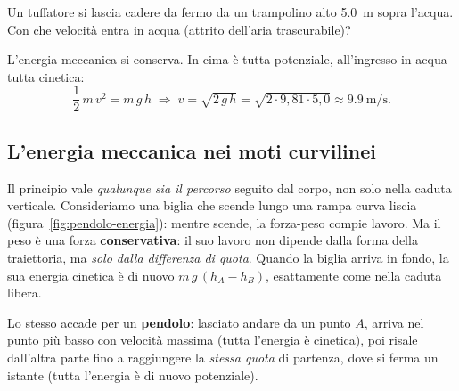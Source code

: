 \begin{testexample}
Un tuffatore si lascia cadere da fermo da un trampolino alto \SI{5,0}{\metre} sopra l'acqua. Con che velocità entra in acqua (attrito dell'aria trascurabile)?

L'energia meccanica si conserva. In cima è tutta potenziale, all'ingresso in acqua tutta cinetica:
\[ \frac12\,m\,v^2 = m\,g\,h \;\Longrightarrow\; v = \sqrt{2\,g\,h} = \sqrt{2 \cdot 9{,}81 \cdot 5{,}0} \approx \SI{9,9}{\metre\per\second}. \]
\end{testexample}

\subsection{L'energia meccanica nei moti curvilinei}
Il principio vale \emph{qualunque sia il percorso} seguito dal corpo, non solo nella caduta verticale. Consideriamo una biglia che scende lungo una rampa curva liscia (figura~\ref{fig:pendolo-energia}): mentre scende, la forza-peso compie lavoro. Ma il peso è una forza \textbf{conservativa}: il suo lavoro non dipende dalla forma della traiettoria, ma \emph{solo dalla differenza di quota}. Quando la biglia arriva in fondo, la sua energia cinetica è di nuovo $m\,g\,(h_A - h_B)$, esattamente come nella caduta libera.

Lo stesso accade per un \textbf{pendolo}: lasciato andare da un punto $A$, arriva nel punto più basso con velocità massima (tutta l'energia è cinetica), poi risale dall'altra parte fino a raggiungere la \emph{stessa quota} di partenza, dove si ferma un istante (tutta l'energia è di nuovo potenziale).

